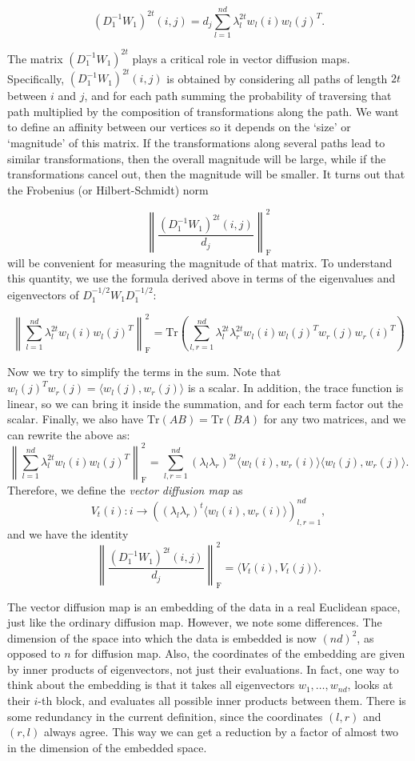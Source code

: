 \[\left( D_1^{-1}W_1\right)^{2t}(i,j) = d_j\sum \limits_{l=1}^{nd} \lambda_l^{2t} w_l(i)w_l(j)^T.\]

The matrix $\left( D_1^{-1}W_1\right)^{2t}$ plays a critical role in vector diffusion maps. Specifically, $\left( D_1^{-1}W_1\right)^{2t}(i,j)$ is obtained by considering all paths of length $2t$ between $i$ and $j$, and for each path summing the probability of traversing that path multiplied by the composition of transformations along the path. We want to define an affinity between our vertices so it depends on the `size' or `magnitude' of this matrix. If the transformations along several paths lead to similar transformations, then the overall magnitude will be large, while if the transformations cancel out, then the magnitude will be smaller. It turns out that the Frobenius (or Hilbert-Schmidt) norm

\[\left\| \frac{\left( D_1^{-1}W_1\right)^{2t}(i,j)}{d_j}\right\|_{\text{F}}^2\]
will be convenient for measuring the magnitude of that matrix. To understand this quantity, we use the formula derived above in terms of the eigenvalues and eigenvectors of $D_1^{-1/2}W_1D_1^{-1/2}$:

\[\left\|\sum \limits_{l=1}^{nd} \lambda_l^{2t} w_l(i)w_l(j)^T\right\|_{\text{F}}^2 =
\text{Tr}\left(\sum \limits_{l,r=1}^{nd} \lambda_l^{2t} \lambda_r^{2t}w_l(i)w_l(j)^T w_r(j)w_r(i)^T \right)\]

Now we try to simplify the terms in the sum. Note that $w_l(j)^T w_r(j) = \langle w_l(j), w_r(j) \rangle$ is a scalar. In addition, the trace function is linear, so we can bring it inside the summation, and for each term factor out the scalar. Finally, we also have $\text{Tr}(AB)=\text{Tr}(BA)$ for any two matrices, and we can rewrite the above as:
\[\left\|\sum \limits_{l=1}^{nd} \lambda_l^{2t} w_l(i)w_l(j)^T\right\|_{\text{F}}^2 = \sum \limits_{l,r=1}^{nd} (\lambda_l\lambda_r)^{2t} \langle w_l(i), w_r(i) \rangle \langle w_l(j), w_r(j) \rangle. \]
Therefore, we define the \emph{vector diffusion map} as
\[ V_t(i) : i \to \left((\lambda_l\lambda_r)^t\langle w_l(i), w_r(i) \rangle \right)_{l,r=1}^{nd}, \]
and we have the identity
\[\left\| \frac{\left( D_1^{-1}W_1\right)^{2t}(i,j)}{d_j}\right\|_{\text{F}}^2 = \langle V_t(i), V_t(j) \rangle. \]

The vector diffusion map is an embedding of the data in a real Euclidean space, just like the ordinary diffusion map. However, we note some differences. The dimension of the space into which the data is embedded is now $(nd)^2$, as opposed to $n$ for diffusion map. Also, the coordinates of the embedding are given by inner products of eigenvectors, not just their evaluations. In fact, one way to think about the embedding is that it takes all eigenvectors $w_1,\ldots,w_{nd}$, looks at their $i$-th block, and evaluates all possible inner products between them. There is some redundancy in the current definition, since the coordinates $(l,r)$ and $(r,l)$ always agree. This way we can get a reduction by a factor of almost two in the dimension of the embedded space.

